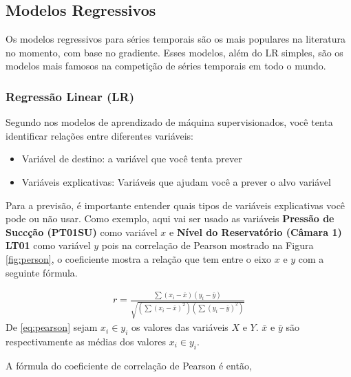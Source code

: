 \subsection{Modelos Regressivos}\label{subsec:reg}

Os modelos regressivos para séries temporais são os mais populares na literatura no momento, com base no gradiente. Esses modelos, além do LR simples, são os modelos mais famosos na competição de séries temporais em todo o mundo. 

\subsubsection{Regress\~ao Linear (LR)}

Segundo  nos modelos de aprendizado de máquina supervisionados, você tenta identificar relações entre diferentes variáveis:

\begin{itemize}
	\item Variável de destino: a variável que você tenta prever
	\item Variáveis explicativas: Variáveis que ajudam você a prever o alvo variável
\end{itemize}

Para a previsão, é importante entender quais tipos de variáveis explicativas você pode ou não usar. Como exemplo, aqui vai ser usado as variáveis \textbf{Pressão de Succção (PT01SU)} como variável $x$ e \textbf{Nível do Reservatório (Câmara 1) LT01} como variável $y$ pois na correlação de Pearson mostrado na Figura \ref{fig:person}, o coeficiente mostra a relação que tem entre o eixo $x$ e $y$ com a seguinte fórmula.



\begin{eqnarray}
	r=\frac{\sum\left(x_i-\bar{x}\right)\left(y_i-\bar{y}\right)}{\sqrt{\left(\sum\left(x_i-\bar{x}\right)^2\right)\left(\sum\left(y_i-\bar{y}\right)^2\right)}}\label{eq:pearson}
\end{eqnarray}
De \eqref{eq:pearson} sejam $x_i \in y_i$ os valores das variáveis $X$ e $Y$.  $\bar{x}$ e $\bar{y}$ são respectivamente as médias dos valores $x_i \in y_i$.

A fórmula do coeficiente de correlação de Pearson é então,

